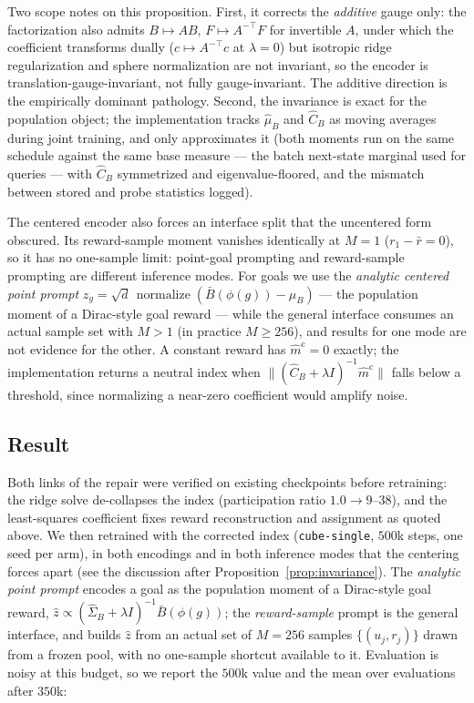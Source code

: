 \documentclass{article}
\begin{document}
Two scope notes on this proposition.
First, it corrects the \emph{additive} gauge only: the factorization also admits $B\mapsto AB$, $F\mapsto A^{-\top}F$ for invertible $A$, under which the coefficient transforms dually ($c\mapsto A^{-\top}c$ at $\lambda=0$) but isotropic ridge regularization and sphere normalization are not invariant, so the encoder is translation-gauge-invariant, not fully gauge-invariant.
The additive direction is the empirically dominant pathology.
Second, the invariance is exact for the population object; the implementation tracks $\hat\mu_B$ and $\hat C_B$ as moving averages during joint training, and only approximates it (both moments run on the same schedule against the same base measure --- the batch next-state marginal used for queries --- with $\hat C_B$ symmetrized and eigenvalue-floored, and the mismatch between stored and probe statistics logged).

The centered encoder also forces an interface split that the uncentered form obscured.
Its reward-sample moment vanishes identically at $M=1$ ($r_1-\bar r=0$), so it has no one-sample limit: point-goal prompting and reward-sample prompting are different inference modes.
For goals we use the \emph{analytic centered point prompt} $z_g = \sqrt d\,\operatorname{normalize}(\bar B(\phi(g))-\hat\mu_B)$ --- the population moment of a Dirac-style goal reward --- while the general interface consumes an actual sample set with $M>1$ (in practice $M\ge256$), and results for one mode are not evidence for the other.
A constant reward has $\hat m^{\mathrm{c}}=0$ exactly; the implementation returns a neutral index when $\|(\hat C_B+\lambda I)^{-1}\hat m^{\mathrm{c}}\|$ falls below a threshold, since normalizing a near-zero coefficient would amplify noise.

\subsection{Result}

Both links of the repair were verified on existing checkpoints before retraining: the ridge solve de-collapses the index (participation ratio $1.0\to 9$--$38$), and the least-squares coefficient fixes reward reconstruction and assignment as quoted above.
We then retrained with the corrected index (\texttt{cube-single}, $500$k steps, one seed per arm), in both encodings and in both inference modes that the centering forces apart (see the discussion after Proposition~\ref{prop:invariance}).
The \emph{analytic point prompt} encodes a goal as the population moment of a Dirac-style goal reward, $\hat z \propto (\hat\Sigma_B+\lambda I)^{-1}\bar B(\phi(g))$; the \emph{reward-sample} prompt is the general interface, and builds $\hat z$ from an actual set of $M=256$ samples $\{(u_j,r_j)\}$ drawn from a frozen pool, with no one-sample shortcut available to it.
Evaluation is noisy at this budget, so we report the $500$k value and the mean over evaluations after $350$k:
\end{document}
